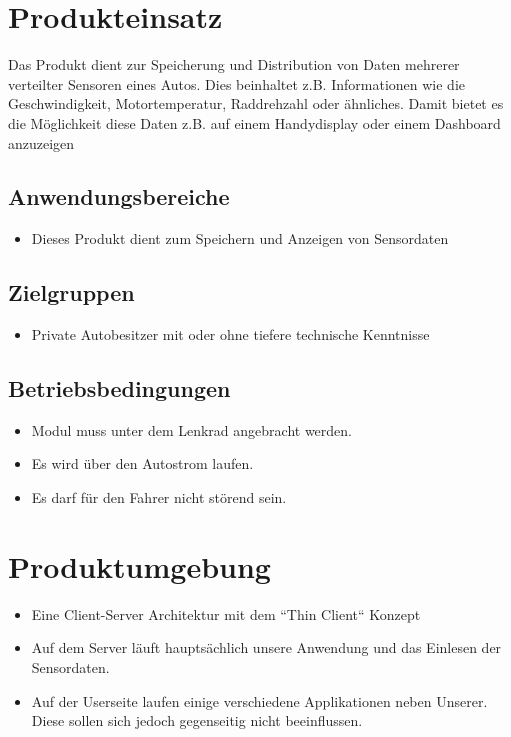 \documentclass[pflichtenheft.tex]{subfiles}
\begin{document}
\chapter{Produkteinsatz}
Das Produkt dient zur Speicherung und Distribution von Daten mehrerer verteilter Sensoren eines Autos. Dies beinhaltet z.B. Informationen wie die Geschwindigkeit, Motortemperatur, Raddrehzahl oder ähnliches. Damit bietet es die Möglichkeit diese Daten z.B. auf einem Handydisplay oder einem Dashboard anzuzeigen


\section{Anwendungsbereiche}
\begin{itemize}
\item
Dieses Produkt dient zum Speichern und Anzeigen von Sensordaten
\end{itemize}


\section{Zielgruppen}
\begin{itemize}
\item
Private Autobesitzer mit oder ohne tiefere technische Kenntnisse
\end{itemize}


\section{Betriebsbedingungen}
\begin{itemize}
\item
Modul muss unter dem Lenkrad angebracht werden.
\item
Es wird über den Autostrom laufen.
\item
Es darf für den Fahrer nicht störend sein.
\end{itemize}


\chapter{Produktumgebung}
\begin{itemize}
\item
Eine Client-Server Architektur mit dem ``Thin Client`` Konzept
\item
Auf dem Server läuft hauptsächlich unsere Anwendung und das Einlesen der Sensordaten.
\item
Auf der Userseite laufen einige verschiedene Applikationen neben Unserer. Diese sollen sich jedoch gegenseitig nicht beeinflussen.
\end{itemize}
\end{document}
